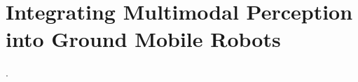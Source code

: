 \chapter{Integrating Multimodal Perception into Ground Mobile Robots}\label{appx:hangfaq2}
\begin{description}[leftmargin=1cm,style=nextline,font=\normalfont]
\item[\cite{sousa:icarsc:2025}] .
\end{description}

\cleardoublepage



